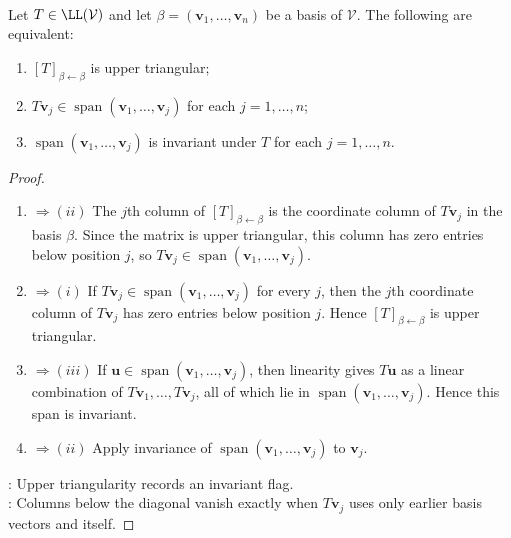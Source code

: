 \begin{theorem} \label{thm:upper-triangular-criteria} \\
Let $T\in\LL(\mathcal{V})$ and let $\beta=(\mathbf{v}_1,\ldots,\mathbf{v}_n)$ be a basis of $\mathcal{V}$. The following are equivalent:
\begin{enumerate}[label=(\roman*)]
\setlength{\itemsep}{0pt}
\item $[T]_{\beta\leftarrow\beta}$ is upper triangular;
\item $T\mathbf{v}_j\in\operatorname{span}(\mathbf{v}_1,\ldots,\mathbf{v}_j)$ for each $j=1,\ldots,n$;
\item $\operatorname{span}(\mathbf{v}_1,\ldots,\mathbf{v}_j)$ is invariant under $T$ for each $j=1,\ldots,n$.
\end{enumerate}
\begin{proof}
\begin{enumerate}[label=(\roman*).]
\setlength{\itemsep}{0pt}
\item[$(i)$]$\Rightarrow (ii)$
The $j$th column of $[T]_{\beta\leftarrow\beta}$ is the coordinate column of $T\mathbf{v}_j$ in the basis $\beta$. Since the matrix is upper triangular, this column has zero entries below position $j$, so $T\mathbf{v}_j\in\operatorname{span}(\mathbf{v}_1,\ldots,\mathbf{v}_j)$.
\item[$(ii)$]$\Rightarrow (i)$
If $T\mathbf{v}_j\in\operatorname{span}(\mathbf{v}_1,\ldots,\mathbf{v}_j)$ for every $j$, then the $j$th coordinate column of $T\mathbf{v}_j$ has zero entries below position $j$. Hence $[T]_{\beta\leftarrow\beta}$ is upper triangular.
\item[$(ii)$]$\Rightarrow (iii)$
If $\mathbf{u}\in\operatorname{span}(\mathbf{v}_1,\ldots,\mathbf{v}_j)$, then linearity gives $T\mathbf{u}$ as a linear combination of $T\mathbf{v}_1,\ldots,T\mathbf{v}_j$, all of which lie in $\operatorname{span}(\mathbf{v}_1,\ldots,\mathbf{v}_j)$. Hence this span is invariant.
\item[$(iii)$]$\Rightarrow (ii)$
Apply invariance of $\operatorname{span}(\mathbf{v}_1,\ldots,\mathbf{v}_j)$ to $\mathbf{v}_j$.
\end{enumerate}
: Upper triangularity records an invariant flag.\\
: Columns below the diagonal vanish exactly when $T\mathbf{v}_j$ uses only earlier basis vectors and itself.
\end{proof}
\end{theorem}

